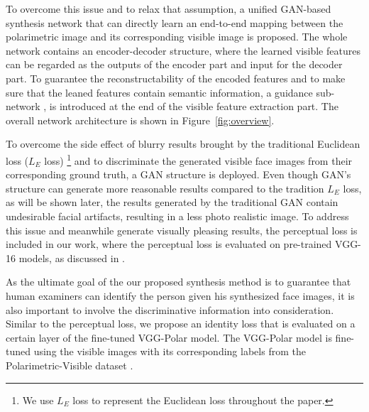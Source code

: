 \documentclass[10pt,twocolumn,letterpaper]{article}
\begin{document}
To overcome this issue and to relax that assumption, a unified GAN-based synthesis network that can directly learn an end-to-end mapping between the polarimetric image and its corresponding visible image is proposed.  The whole network contains an encoder-decoder structure, where the learned visible features can be regarded as the outputs of the encoder part and input for the decoder part. To guarantee the reconstructability  of the  encoded features and to make sure that the leaned features contain semantic information, a guidance sub-network \cite{deep_supervision}, is introduced at the end of the visible feature extraction part.  The overall network architecture is shown in Figure~\ref{fig:overview}. 

To overcome the side effect of blurry results brought by the traditional Euclidean loss ($L_E$ loss) \footnote{We use $L_E$ loss to represent the Euclidean loss throughout the paper. } and to discriminate the generated visible face images from their corresponding ground truth, a GAN structure is deployed. Even though GAN's structure can generate more reasonable results compared to the tradition $L_E$ loss, as will be shown later, the results generated by the traditional GAN contain undesirable facial artifacts, resulting in a less photo realistic image. To address this issue and meanwhile generate visually pleasing results, the  perceptual loss is included in our work, where the perceptual loss is evaluated on pre-trained VGG-16 models, as discussed in \cite{perceptual_loss,hang_style}. 

As the ultimate goal of the our proposed synthesis method is to guarantee that human examiners can identify the person given his synthesized face images, it is also important to involve the discriminative information into consideration.  Similar to the perceptual loss, we propose an identity loss that is evaluated on a certain layer of the fine-tuned VGG-Polar model. The VGG-Polar model is fine-tuned using the visible images with its corresponding labels from the Polarimetric-Visible dataset \cite{ijcb_datasets2}. 
\end{document}
